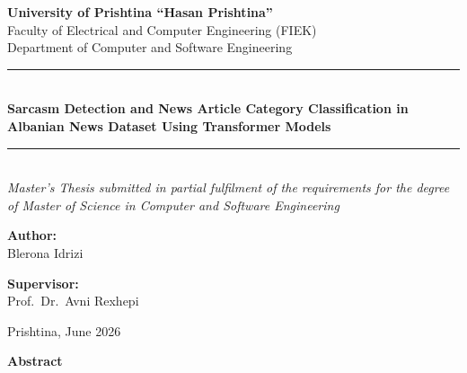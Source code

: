 \documentclass[12pt,a4paper]{article}
\begin{document}
\begin{titlepage}
    \begin{center}
        \vspace*{1.2cm}
        {\large \textbf{University of Prishtina ``Hasan Prishtina''}}\\[0.3cm]
        {\large Faculty of Electrical and Computer Engineering (FIEK)}\\[0.3cm]
        {\large Department of Computer and Software Engineering}\\[1.5cm]

        \rule{\linewidth}{0.5mm}\\[0.4cm]
        {\LARGE \bfseries Sarcasm Detection and News Article Category Classification in Albanian News Dataset Using Transformer Models}\\[0.4cm]
        \rule{\linewidth}{0.5mm}\\[1.2cm]

        {\large \textit{Master's Thesis submitted in partial fulfilment of the requirements for the degree of Master of Science in Computer and Software Engineering}}\\[2cm]

        \begin{minipage}[t]{0.45\textwidth}
            \begin{flushleft}
                \textbf{Author:}\\
                Blerona Idrizi
            \end{flushleft}
        \end{minipage}
        \hfill
        \begin{minipage}[t]{0.45\textwidth}
            \begin{flushright}
                \textbf{Supervisor:}\\
                Prof.\ Dr.\ Avni Rexhepi
            \end{flushright}
        \end{minipage}

        \vfill
        {\large Prishtina, June 2026}
    \end{center}
\end{titlepage}

\newpage
\thispagestyle{plain}
\begin{center}
    \Large\bfseries Abstract
\end{center}
\vspace{0.5cm}
\end{document}
